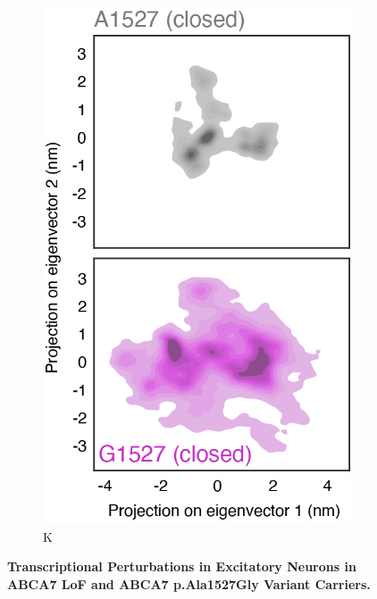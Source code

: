 \begin{figure}[H]
\begin{subfigure}[t]{0.32\textwidth}
    \end{subfigure}
    \begin{subfigure}[t]{0.16\textwidth}
        \caption{K}
        \includegraphics[width=\textwidth]{./main_plots/variant_projection_closed.png}        
    \end{subfigure}
    \caption{
        \textbf{Transcriptional Perturbations in Excitatory Neurons in ABCA7 LoF and ABCA7 p.Ala1527Gly Variant Carriers.}\\
    }
    \label{fig:main_neurons}
\end{figure}
